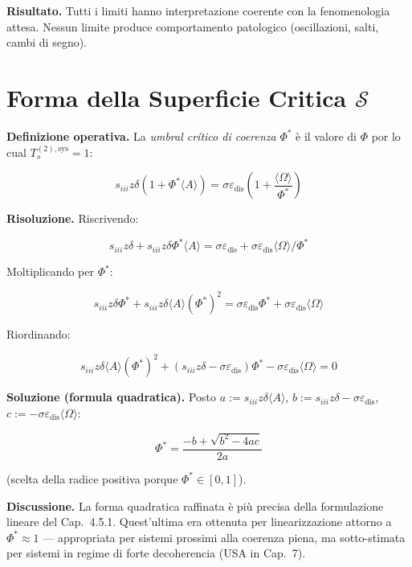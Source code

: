 \Proved{} \textbf{Risultato.} Tutti i limiti hanno interpretazione
coerente con la fenomenologia attesa. Nessun limite produce
comportamento patologico (oscillazioni, salti, cambi di segno).



\section{\texorpdfstring{Forma della Superficie Critica
\(\mathcal{S}\)}{Forma della Superficie Critica \textbackslash mathcal\{S\}}}\label{forma-della-superficie-critica-mathcals}

\Hypoth{} \textbf{Definizione operativa.} La \emph{umbral crítico di
coerenza} \(\Phi^*\) è il valore di \(\Phi\) por lo cual
\(T_s^{(2),\text{sys}} = 1\):

\[
s_{iii} z \delta (1 + \Phi^* \langle A\rangle) = \sigma \varepsilon_{\text{dis}} \left(1 + \frac{\langle\Omega\rangle}{\Phi^*}\right)
\]

\Proved{} \textbf{Risoluzione.} Riscrivendo:

\[
s_{iii} z \delta + s_{iii} z \delta \Phi^* \langle A\rangle = \sigma \varepsilon_{\text{dis}} + \sigma \varepsilon_{\text{dis}} \langle\Omega\rangle / \Phi^*
\]

Moltiplicando per \(\Phi^*\):

\[
s_{iii} z \delta \Phi^* + s_{iii} z \delta \langle A\rangle (\Phi^*)^2 = \sigma\varepsilon_{\text{dis}}\Phi^* + \sigma\varepsilon_{\text{dis}}\langle\Omega\rangle
\]

Riordinando:

\[
s_{iii} z \delta \langle A\rangle (\Phi^*)^2 + (s_{iii}z\delta - \sigma\varepsilon_{\text{dis}}) \Phi^* - \sigma\varepsilon_{\text{dis}}\langle\Omega\rangle = 0
\]

\Proved{} \textbf{Soluzione (formula quadratica).} Posto
\(a := s_{iii}z\delta\langle A\rangle\),
\(b := s_{iii}z\delta - \sigma\varepsilon_{\text{dis}}\),
\(c := -\sigma\varepsilon_{\text{dis}}\langle\Omega\rangle\):

\[
\boxed{\Phi^* = \frac{-b + \sqrt{b^2 - 4ac}}{2a}}
\]

(scelta della radice positiva porque \(\Phi^* \in [0,1]\)).

\Hypoth{} \textbf{Discussione.} La forma quadratica raffinata è più
precisa della formulazione lineare del Cap.~4.5.1. Quest'ultima era
ottenuta per linearizzazione attorno a \(\Phi^* \approx 1\) ---
appropriata per sistemi prossimi alla coerenza piena, ma sotto-stimata
per sistemi in regime di forte decoherencia (USA in Cap.~7).

